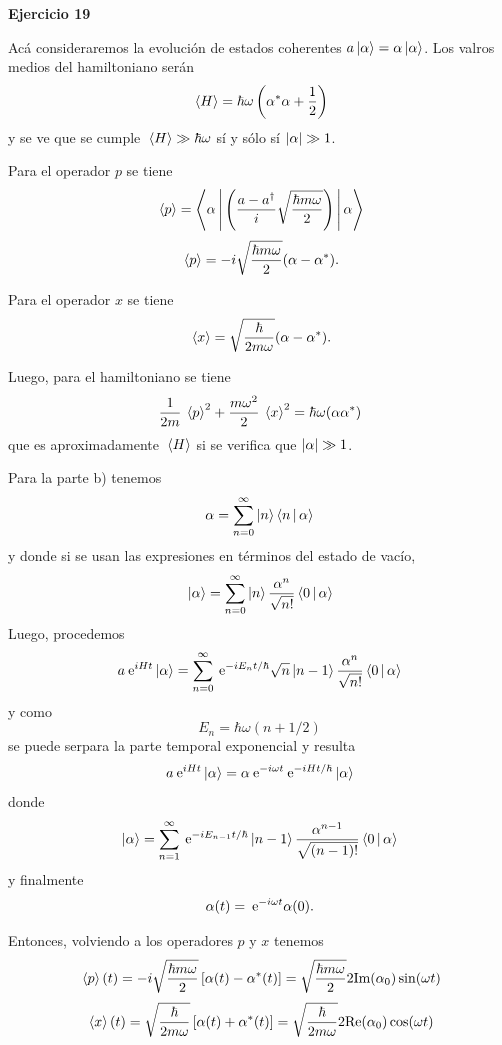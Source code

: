 \documentclass[10pt,oneside]{CBFT_book}
\begin{document}
\begin{ejemplo}{\bf Ejercicio 19}

Acá consideraremos la evolución de estados coherentes $ a \Ket{\alpha} = \alpha \Ket{\alpha} $.
Los valros medios del hamiltoniano serán
\[
	\:\left\langle H \right\rangle = \hbar \omega \left( \alpha^* \alpha + \frac{1}{2} \right)
\]
y se ve que se cumple $ \:\left\langle H \right\rangle \gg \hbar \omega $ sí y sólo sí $ |\alpha| \gg 1 $.

Para el operador $p$ se tiene
\[
	\:\left\langle p \right\rangle = \Braket{ \alpha | \left( \frac{a-a^\dagger}{i} 
	\sqrt{\frac{\hbar m \omega}{2}} \right) | \alpha }
\]
\[
	\:\left\langle p \right\rangle = - i \sqrt{\frac{\hbar m \omega}{2}} (\alpha - \alpha^*).
\]

Para el operador $x$ se tiene
\[
	\:\left\langle x \right\rangle = \sqrt{ \frac{\hbar}{ 2 m \omega } } (\alpha - \alpha^*).
\] 

Luego, para el hamiltoniano se tiene
\[
	\frac{1}{2m}\:\left\langle p \right\rangle^2 + \frac{m\omega^2}{2}\:\left\langle x \right\rangle^2 = \hbar \omega (\alpha \alpha^*)
\]
que es aproximadamente $\:\left\langle H \right\rangle$ si se verifica que $|\alpha| \gg 1$.

Para la parte b) tenemos
\[
	\alpha = \sum_{n=0}^\infty \Ket{n} \Braket{n|\alpha}
\]
y donde si se usan las expresiones en términos del estado de vacío,
\[
	\ket{\alpha} = \sum_{n=0}^\infty \Ket{n} \frac{\alpha^n}{\sqrt{n!}} \Braket{0|\alpha}
\]
Luego, procedemos
\[
	a \:\mathrm{e}^{ i H t } \Ket{\alpha} = \sum_{n=0}^\infty 
	\:\mathrm{e}^{-i E_n t / \hbar } \sqrt{n} \Ket{n-1} \frac{\alpha^n}{\sqrt{n!}} \Braket{0|\alpha}
\]
y como
\[
	E_n = \hbar \omega ( n + 1/2 )
\]
se puede serpara la parte temporal exponencial y resulta
\[
	a \:\mathrm{e}^{ i H t } \Ket{\alpha} = 
	\alpha \:\mathrm{e}^{ - i \omega t } \:\mathrm{e}^{ -i H t / \hbar } \Ket{\alpha}
\]
donde 
\[
	\ket{ \alpha } = \sum_{n=1}^\infty \:\mathrm{e}^{-iE_{n-1}t/\hbar}\Ket{n-1} 
	\frac{\alpha^{n-1}}{\sqrt{(n-1)!}} \Braket{0|\alpha}
\]
y finalmente
\[
	\alpha(t)  = \:\mathrm{e}^{-i \omega t} \alpha(0).
\]

Entonces, volviendo a los operadores $p$ y $x$ tenemos
\[
	\:\left\langle p \right\rangle(t) = - i \sqrt{\frac{\hbar m \omega}{2}} 
	\left[ \alpha(t) - \alpha^*(t) \right] =
	\sqrt{\frac{\hbar m \omega}{2}} 2 \text{Im}(\alpha_0)\sin(\omega t)
\]
\[
	\:\left\langle x \right\rangle(t) = \sqrt{\frac{\hbar}{ 2 m \omega }} 
	\left[ \alpha(t) + \alpha^*(t) \right] =
	\sqrt{\frac{\hbar}{2 m \omega }} 2 \text{Re}(\alpha_0)\cos(\omega t)
\]
\end{ejemplo}



\end{document}
